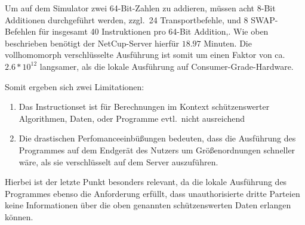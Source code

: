 Um auf dem Simulator zwei 64-Bit-Zahlen zu addieren, müssen acht 8-Bit Additionen durchgeführt werden, zzgl.\ 24 Transportbefehle, und 8 SWAP-Befehlen
für insgesamt 40 Instruktionen pro 64-Bit Addition,.
Wie oben beschrieben benötigt der NetCup-Server hierfür $18.97$ Minuten.
Die vollhomomorph verschlüsselte Ausführung ist somit um einen Faktor von ca. $2.6*10^{12}$ langsamer,
als die lokale Ausführung auf Consumer-Grade-Hardware.

Somit ergeben sich zwei Limitationen:

\begin{enumerate}
    \item Das Instructionset ist für Berechnungen im Kontext schützenswerter Algorithmen, Daten, oder Programme evtl.\ nicht ausreichend
    \item Die drastischen Perfomanceeinbüßungen bedeuten,
    dass die Ausführung des Programmes auf dem Endgerät des Nutzers um Größenordnungen schneller wäre, als sie verschlüsselt auf dem Server auszuführen.
\end{enumerate}

Hierbei ist der letzte Punkt besonders relevant, da die lokale Ausführung des Programmes ebenso die Anforderung erfüllt,
dass unauthorisierte dritte Parteien keine Informationen über die oben genannten schützenswerten Daten erlangen können.

